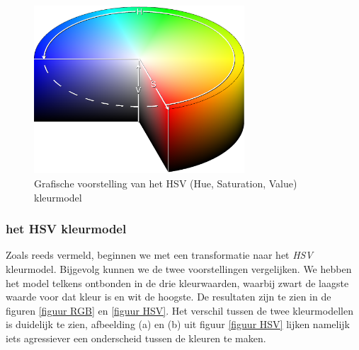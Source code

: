 \documentclass[a4paper,kulak]{kulakarticle}
\begin{document}
\begin{figure}[H]
	\centering
	\includegraphics[width=0.7\textwidth]{HSV_vb.png}
	
	\caption{Grafische voorstelling van het HSV (Hue, Saturation, Value) kleurmodel}
	\label{figuur hsv_schema}
\end{figure}

\subsubsection{het HSV kleurmodel}
Zoals reeds vermeld, beginnen we met een transformatie naar het \textit{HSV} kleurmodel. Bijgevolg kunnen we de twee voorstellingen vergelijken. We hebben het model telkens ontbonden in de drie kleurwaarden, waarbij zwart de laagste waarde voor dat kleur is en wit de hoogste. De resultaten zijn te zien in de figuren \ref{figuur RGB} en \ref{figuur HSV}. Het verschil tussen de twee kleurmodellen is duidelijk te zien, afbeelding (a) en (b) uit figuur \ref{figuur HSV} lijken namelijk iets agressiever een onderscheid tussen de kleuren te maken.
\end{document}
